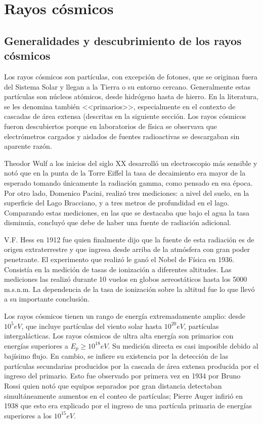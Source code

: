 \documentclass{book}
\begin{document}


\section{Rayos c\'osmicos}
\subsection{Generalidades y descubrimiento de los rayos c\'osmicos}
Los rayos c\'osmicos son part\'iculas, con excepci\'on de fotones, que se originan fuera del Sistema Solar y llegan a la Tierra o su entorno cercano. Generalmente estas part\'iculas son n\'ucleos at\'omicos, desde hidr\'ogeno hasta de hierro. En la literatura, se les denomina tambi\'en <<primarios>>, especialmente en el contexto de cascadas de \'area extensa (descritas en la siguiente secci\'on. Los rayos c\'osmicos fueron descubiertos porque en laboratorios de f\'isica se observava que electr\'ometros cargados y aislados de fuentes radioactivas se descargaban sin aparente raz\'on. \citep{ASOREY}

Theodor Wulf a los inicios del siglo XX desarroll\'o un electroscopio m\'as sensible y not\'o que en la punta de la Torre Eiffel la tasa de decaimiento era mayor de la esperado tomando \'unicamente la radiaci\'on gamma, como pensado en esa \'epoca. Por otro lado, Domenico Pacini, realiz\'o tres mediciones: a nivel del suelo, en la superficie del Lago Bracciano, y a tres metros de profundidad en el lago. Comparando estas mediciones, en las que se destacaba que bajo el agua la tasa disminu\'ia, concluy\'o que debe de haber una fuente de radiaci\'on adicional. \citep{ASOREY}

V.F. Hess en 1912 fue quien finalmente dijo que la fuente de esta radiaci\'on es de origen extraterrestre y que ingresa desde arriba de la atm\'osfera con gran poder penetrante. El experimento que realiz\'o le gan\'o el Nobel de F\'isica en 1936. Consist\'ia en la medici\'on de tasas de ionizaci\'on a diferentes altitudes. Las mediciones las realiz\'o durante 10 vuelos en globos aereost\'aticos hasta los 5000 m.s.n.m. La dependencia de la tasa de ionizaci\'on sobre la altitud fue lo que llev\'o a su importante conclusi\'on. \citep{ASOREY}

Los rayos c\'osmicos tienen un rango de energ\'ia extremadamente amplio: desde $10^5 eV$, que incluye part\'iculas del viento solar hasta $10^20 eV$, part\'iculas intergal\'acticas. Los rayos c\'osmicos de ultra alta energ\'ia son primarios con energ\'ias superiores a $E_p \geq 10^18 eV$. Su medici\'on directa es casi imposible debido al baj\'isimo flujo. En cambio, se infiere su existencia por la detecci\'on de las part\'iculas secundarias producidos por la cascada de \'area extensa producida por el ingreso del primario. Esto fue observado por primera vez en 1934 por Bruno Rossi quien not\'o que equipos separados por gran distancia detectaban simult\'aneamente aumentos en el conteo de part\'iculas; Pierre Auger infiri\'o en 1938 que esto era explicado por el ingreso de una part\'icula primaria de energ\'ias superiores a los $10^15 eV$. \citep{ASOREY}
\end{document}
